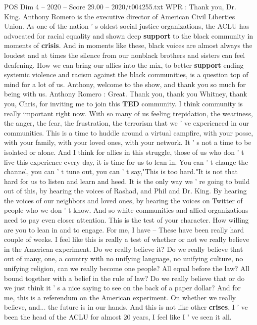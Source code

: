 \begin{textsample}{POS Dim 4 – 2020 – Score 29.00 – 2020/t004255.txt}
WPR : Thank you, Dr.
King.
Anthony Romero is the executive director of American Civil Liberties Union.
As one of the nation ' s oldest social justice organizations, the ACLU has advocated for racial equality and shown deep \textbf{support} to the black community in moments of \textbf{crisis}.
And in moments like these, black voices are almost always the loudest and at times the silence from our nonblack brothers and sisters can feel deafening.
How we can bring our allies into the mix, to better \textbf{support} ending systemic violence and racism against the black communities, is a question top of mind for a lot of us.
Anthony, welcome to the show, and thank you so much for being with us.
Anthony Romero : Great.
Thank you, thank you Whitney, thank you, Chris, for inviting me to join this \textbf{TED} community.
I think community is really important right now.
With so many of us feeling trepidation, the weariness, the anger, the fear, the frustration, the terrorism that we ' ve experienced in our communities.
This is a time to huddle around a virtual campfire, with your posse, with your family, with your loved ones, with your network.
It ' s not a time to be isolated or alone.
And I think for allies in this struggle, those of us who don ' t live this experience every day, it is time for us to lean in.
You can ' t change the channel, you can ' t tune out, you can ' t say,"This is too hard."It is not that hard for us to listen and learn and heed.
It is the only way we ' re going to build out of this, by hearing the voices of Rashad, and Phil and Dr.
King.
By hearing the voices of our neighbors and loved ones, by hearing the voices on Twitter of people who we don ' t know.
And so white communities and allied organizations need to pay even closer attention.
This is the test of your character.
How willing are you to lean in and to engage.
For me, I have -- These have been really hard couple of weeks.
I feel like this is really a test of whether or not we really believe in the American experiment.
Do we really believe it?
Do we really believe that out of many, one, a country with no unifying language, no unifying culture, no unifying religion, can we really become one people?
All equal before the law?
All bound together with a belief in the rule of law?
Do we really believe that or do we just think it ' s a nice saying to see on the back of a paper dollar?
And for me, this is a referendum on the American experiment.
On whether we really believe, and... the future is in our hands.
And this is not like other \textbf{crises}, I ' ve been the head of the ACLU for almost 20 years, I feel like I ' ve seen it all.

\end{textsample}
